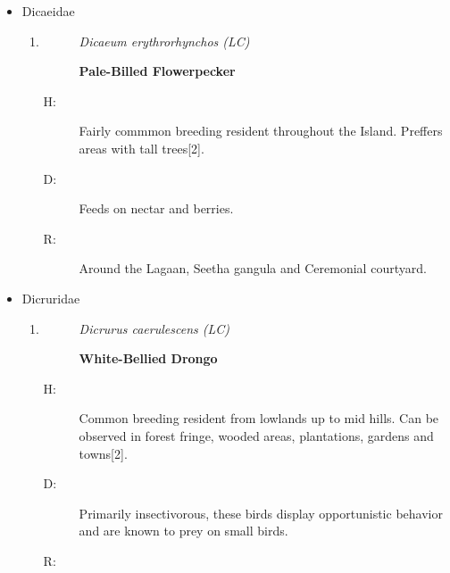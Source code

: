 \begin{itemize}
\begin{enumerate}
\begin{description}
\item[]%
\textbf{Pied Cuckoo/Jacobin Cuckoo}%
\end{description}%
\begin{description}%
\item[H: ]%
Uncommon breeding resident from lowlands to mid hills. A winter migrant population also exist{[}2{]}.%
\item[D: ]%
 Feeds on various insects, especially favoring hairy caterpillars. Also known for consuming some fruits%
\item[R: ]%
Single sighting at Boat Yard.%
\end{description}%
\end{enumerate}%
\item%
Dicaeidae%
\begin{enumerate}%
\item%
\begin{description}%
\item[]%
\textit{Dicaeum erythrorhynchos (LC)}%
\item[]%
\textbf{Pale{-}Billed Flowerpecker}%
\end{description}%
\begin{description}%
\item[H: ]%
Fairly commmon breeding resident throughout the Island. Preffers areas with tall trees{[}2{]}.%
\item[D: ]%
Feeds on nectar and berries.%
\item[R: ]%
Around the Lagaan, Seetha gangula and Ceremonial courtyard.%
\end{description}%
\end{enumerate}%
\item%
Dicruridae%
\begin{enumerate}%
\item%
\begin{description}%
\item[]%
\textit{Dicrurus caerulescens (LC)}%
\item[]%
\textbf{White{-}Bellied Drongo}%
\end{description}%
\begin{description}%
\item[H: ]%
Common breeding resident from lowlands up to mid hills. Can be observed in forest fringe, wooded areas, plantations, gardens and towns{[}2{]}.%
\item[D: ]%
Primarily insectivorous, these birds display opportunistic behavior and are known to prey on small birds.%
\item[R: ]%

\end{description}
\end{enumerate}
\end{itemize}

